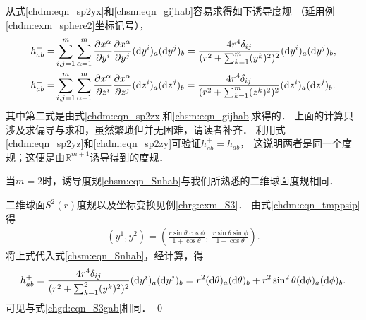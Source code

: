 从式\eqref{chdm:eqn_sp2yx}和\eqref{chsm:eqn_gijhab}容易求得如下诱导度规
（延用例\ref{chdm:exm_sphere2}坐标记号），
\begin{align}
    h^{+}_{ab}=& \sum_{i,j=1}^{m}\sum_{\alpha=1}^{m}\frac{\partial x^\alpha}{\partial y^i}
    \frac{\partial x^\alpha}{\partial y^j} ({\rm d}y^i)_a ({\rm d}y^j)_b
    = \frac{4r^4 \delta_{ij}} {(r^2+\sum\nolimits_{k=1}^{m} (y^k)^2)^2}
    ({\rm d}y^i)_a ({\rm d}y^j)_b , \label{chsm:eqn_Snhab} \\
    h^{-}_{ab}=& \sum_{i,j=1}^{m}\sum_{\alpha=1}^{m}\frac{\partial x^\alpha}{\partial z^i}
    \frac{\partial x^\alpha}{\partial z^j} ({\rm d}z^i)_a ({\rm d}z^j)_b
    = \frac{4r^4 \delta_{ij}} {(r^2+\sum\nolimits_{k=1}^{m} (z^k)^2)^2}
    ({\rm d}z^i)_a ({\rm d}z^j)_b .
\end{align}  %
其中第二式是由式\eqref{chdm:eqn_sp2zx}和\eqref{chsm:eqn_gijhab}求得的．
上面的计算只涉及求偏导与求和，虽然繁琐但并无困难，请读者补齐．
利用式\eqref{chdm:eqn_sp2yz}和\eqref{chdm:eqn_sp2zy}可验证$h^{+}_{ab}=h^{-}_{ab}$，
这说明两者是同一个度规；这便是由$\mathbb{R}^{m+1}$诱导得到的度规．

\begin{example}\label{chsm:exm_S2}
    当$m=2$时，诱导度规\eqref{chsm:eqn_Snhab}与我们所熟悉的二维球面度规相同．
\end{example}
二维球面$S^2(r)$度规以及坐标变换见例\ref{chrg:exm_S3}．
由式\eqref{chdm:eqn_tmppsip}得
\begin{align}
    (y^1,y^2) %
    = \left(\frac{r\sin\theta \cos\phi }{1+\cos\theta},\ \frac{r\sin\theta \sin\phi}{1+\cos\theta}\right) .
\end{align}
将上式代入式\eqref{chsm:eqn_Snhab}，经计算，得
\begin{align*}
    h^{+}_{ab}= \frac{4r^4 \delta_{ij}} {(r^2+\sum\nolimits_{k=1}^{2} (y^k)^2)^2}
    ({\rm d}y^i)_a ({\rm d}y^j)_b 
    =  r^2 ({\rm d}\theta )_a ({\rm d}\theta )_b 
    + r^2\sin^2 \theta  ({\rm d}\phi )_a ({\rm d}\phi )_b .
\end{align*}
可见与式\eqref{chgd:eqn_S3gab}相同．  \qed

